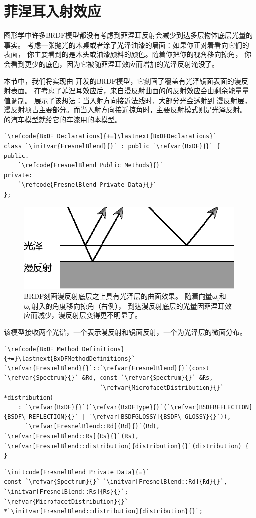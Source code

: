 \section{菲涅耳入射效应}\label{sec:菲涅耳入射效应}
图形学中许多BRDF模型都没有考虑到菲涅耳反射会减少到达多层物体底层光量的事实。
考虑一张抛光的木桌或者涂了光泽油漆的墙面：如果你正对着看向它们的表面，
你主要看到的是木头或油漆颜料的颜色。随着你把你的视角移向掠角，
你会看到更少的底色，因为它被随菲涅耳效应而增加的光泽反射淹没了。

本节中，我们将实现由\citet{AshikhminPhong,Ashikhmin01012000}
开发的BRDF模型，它刻画了覆盖有光泽镜面表面的漫反射表面。
在考虑了菲涅耳效应后，来自漫反射曲面的的反射效应会由剩余能量量值调制。
展示了该想法：当入射方向接近法线时，大部分光会透射到
漫反射层，漫反射项占主要部分。而当入射方向接近掠角时，主要反射模式则是光泽反射。
的汽车模型就给它的车漆用的本模型。
\begin{lstlisting}
`\refcode{BxDF Declarations}{+=}\lastnext{BxDFDeclarations}`
class `\initvar{FresnelBlend}{}` : public `\refvar{BxDF}{}` {
public:
    `\refcode{FresnelBlend Public Methods}{}`
private:
    `\refcode{FresnelBlend Private Data}{}`
};
\end{lstlisting}

\begin{figure}[htbp]
    \centering
    \includegraphics[width=0.65\linewidth]{Pictures/chap08/Fresnelincidence.eps}
    \caption{ BRDF刻画漫反射底层之上具有光泽层的曲面效果。
    随着向量${\bm\omega}_{\mathrm{i}}$和${\bm\omega}_{\mathrm{o}}$射入的角度移向掠角（右例），
    到达漫反射底层的光量因菲涅耳效应而减少，漫反射层变得更不明显了。}
    \label{fig:8.23}
\end{figure}

该模型接收两个光谱，一个表示漫反射和镜面反射，一个为光泽层的微面分布。
\begin{lstlisting}
`\refcode{BxDF Method Definitions}{+=}\lastnext{BxDFMethodDefinitions}`
`\refvar{FresnelBlend}{}`::`\refvar{FresnelBlend}{}`(const `\refvar{Spectrum}{}` &Rd, const `\refvar{Spectrum}{}` &Rs,
                           `\refvar{MicrofacetDistribution}{}` *distribution) 
    : `\refvar{BxDF}{}`(`\refvar{BxDFType}{}`(`\refvar[BSDFREFLECTION]{BSDF\_REFLECTION}{}` | `\refvar[BSDFGLOSSY]{BSDF\_GLOSSY}{}`)),
      `\refvar[FresnelBlend::Rd]{Rd}{}`(Rd), `\refvar[FresnelBlend::Rs]{Rs}{}`(Rs), `\refvar[FresnelBlend::distribution]{distribution}{}`(distribution) { }
\end{lstlisting}
\begin{lstlisting}
`\initcode{FresnelBlend Private Data}{=}`
const `\refvar{Spectrum}{}` `\initvar[FresnelBlend::Rd]{Rd}{}`, `\initvar[FresnelBlend::Rs]{Rs}{}`;
`\refvar{MicrofacetDistribution}{}` *`\initvar[FresnelBlend::distribution]{distribution}{}`;
\end{lstlisting}

